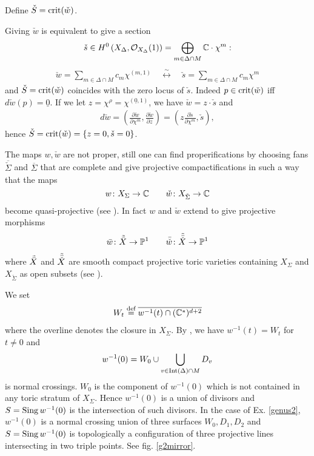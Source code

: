 \documentclass[../main.tex]{subfiles}
\begin{document}
Define $\check{S} = \operatorname{crit}(\check{w})$.

\begin{rem}
Giving $\check{w}$ is equivalent to give a section 
\[
\check{s} \in H^0 \left( X_\Delta,\mathcal{O}_{X_\Delta} (1) \right) = \bigoplus_{m \in \Delta \cap M} \mathbb{C} \cdot \chi^m:
\]
\begin{align*}
    \check{w} = \sum_{m \in \Delta \cap M} c_m \chi^{(m,1)} \quad  \stackrel{\sim}{\longleftrightarrow} \quad \check{s} = \sum_{m \in \Delta\cap M} c_m \chi^m
\end{align*}
and $\check{S}=\operatorname{crit}(\check{w})$ coincides with the zero locus of $\check{s}$. Indeed $p \in \operatorname{crit}(\check{w})$ iff $d\check{w}(p)=\underline{0}$. If we let $z = \chi^\rho = \chi^{(\underline{0},1)}$, we have $\check{w}=z \cdot \check{s}$ and
\begin{align*}
    d\check{w} = \left( \frac{\partial\check{w}}{\partial \chi^m}, \frac{\partial \check{w}}{\partial z} \right) = \left( z \frac{\partial\check{s}}{\partial \chi^m}, \check{s} \right) , 
\end{align*}
hence $\check{S}=\operatorname{crit}(\check{w}) = \{ z=0,  \check{s} =0 \}$.
\end{rem}

The maps $w, \check{w}$ are not proper, still one can find properifications by choosing fans $\overline{\check{\Sigma}}$ and $\overline{{\Sigma}}$ that are complete and give projective compactifications in such a way that the maps 
\[
  w \colon X_{\Sigma} \to \mathbb{C} \qquad \check{w} \colon X_{\check{\Sigma}} \to \mathbb{C} 
\]
become quasi-projective (see \cite[Cor. 2.10]{GKR17}). In fact $w$ and $\check{w}$ extend to give projective morphisms
\begin{align*}
\bar{w} \colon \Tilde{\bar {X}} \to \mathbb{P}^1    \qquad \bar{\check{w}} \colon \Tilde{\bar{\check{X}}} \to \mathbb{P}^1
\end{align*}
where $\Tilde{\bar {X}}$ and $\Tilde{\bar{\check{X}}}$ are smooth compact projective toric varieties containing $ X_{\Sigma}$ and $X_{\check{\Sigma}}$ as open subsets (see \cite[Prop. 2.8, 2.9]{GKR17}).


We set
\begin{align}
     W_t \stackrel{\text{def}}{=} \overline{w^{-1}(t) \cap (\mathbb{C}^*)^{d+2}}
\end{align}
where the overline denotes the closure in $X_\Sigma$.
By \cite[Prop. 2.20]{GKR17}, we have $w^{-1}(t) = W_t$ for $t \neq 0$ and
\begin{align*}
w^{-1}(0) = W_0 \cup \bigcup_{v \in \operatorname{Int}(\Delta) \cap M} D_v
\end{align*}
is normal crossings. $W_0$ is the component of $w^{-1}(0)$ which is not contained in any toric stratum of $X_\Sigma$.
Hence $w^{-1}(0)$ is a union of divisors and $S = \operatorname{Sing} w^{-1}(0)$ is the intersection of such divisors. In the case of Ex. \ref{genus2}, $w^{-1}(0)$ is a normal crossing union of three surfaces $W_0, D_1, D_2$ and $S = \operatorname{Sing} w^{-1}(0)$ is topologically a configuration of three projective lines intersecting in two triple points. See fig. \ref{g2mirror}.
\end{document}

